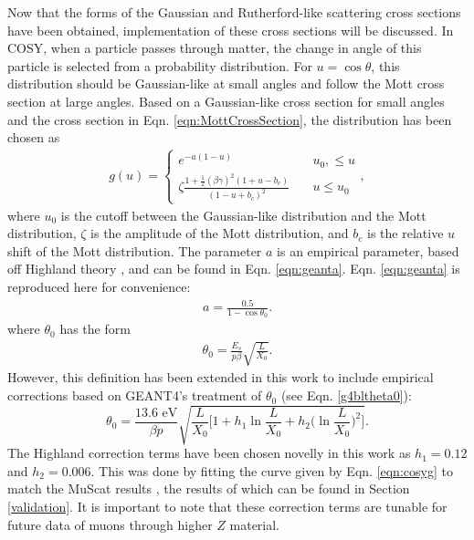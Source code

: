 \label{ssc:COSYScatteringImplementation} Now that the forms of the Gaussian and Rutherford-like scattering cross sections have been obtained, implementation of these cross sections will be discussed. In COSY, when a particle passes through matter, the change in angle of this particle is selected from a probability distribution. For $u=\cos\theta$, this distribution should be Gaussian-like at small angles \cite{gs} and follow the Mott cross section at large angles. Based on a Gaussian-like cross section for small angles and the cross section in Eqn. \ref{eqn:MottCrossSection}, the distribution has been chosen as
\begin{align}\label{eqn:cosyg}
g(u)=	\begin{cases}
	e^{-a(1-u)} & \quad u_0 ,\leq u \\
	\zeta\frac{1+\frac{1}{2}(\beta\gamma)^2(1+u-b_c)}{(1-u+b_c)^2} & \quad u\leq u_0
	\end{cases},
\end{align}
where $u_0$ is the cutoff between the Gaussian-like distribution and the Mott distribution, $\zeta$ is the amplitude of the Mott distribution, and $b_c$ is the relative $u$ shift of the Mott distribution. The parameter $a$ is an empirical parameter, based off Highland theory \cite{highland}, and can be found in Eqn. \ref{eqn:geanta}. Eqn. \ref{eqn:geanta} is reproduced here for convenience:
\begin{align*}
a=\frac{0.5}{1-\cos\theta_0}.
\end{align*}
where $\theta_0$ has the form \cite{highland} 
\begin{align*}
\theta_0 = \frac{E_s}{p\beta} \sqrt{\frac{L}{X_0}}.
\end{align*}
However, this definition has been extended in this work to include empirical corrections based on GEANT4's \cite{geant4} treatment of $\theta_0$ (see Eqn. \ref{g4bltheta0}):
\begin{equation}\label{eqn:cosytheta0}
\theta_0 = \frac{13.6 \text{ eV}}{\beta p} \sqrt{\frac{L}{X_0} \Big[ 1+h_1 \ln \frac{L}{X_0} + h_2 \Big(\ln \frac{L}{X_0}\Big)^2 \Big] }.
\end{equation}
The Highland correction terms have been chosen novelly in this work as $h_1=0.12$ and $h_2=0.006$. This was done by fitting the curve given by Eqn. \ref{eqn:cosyg} to match the MuScat results \cite{muscat}, the results of which can be found in Section \ref{validation}. It is important to note that these correction terms are tunable for future data of muons through higher $Z$ material.

